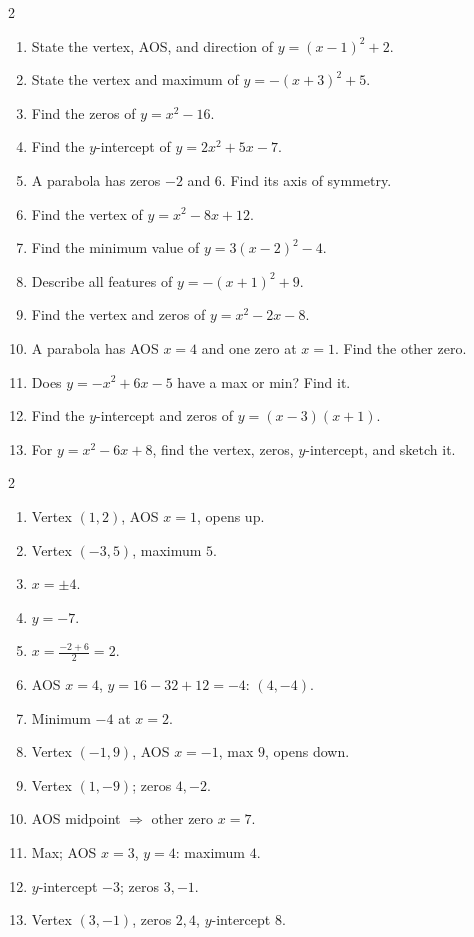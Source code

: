 \documentclass[11pt]{article}
\begin{document}
\clearpage
{}

\begin{recapbox}
\begin{multicols}{2}
\small
\begin{enumerate}[leftmargin=*,itemsep=3pt]
  \item State the vertex, AOS, and direction of $y=(x-1)^2+2$.
  \item State the vertex and maximum of $y=-(x+3)^2+5$.
  \item Find the zeros of $y=x^2-16$.
  \item Find the $y$-intercept of $y=2x^2+5x-7$.
  \item A parabola has zeros $-2$ and $6$. Find its axis of symmetry.
  \item Find the vertex of $y=x^2-8x+12$.
  \item Find the minimum value of $y=3(x-2)^2-4$.
  \item Describe all features of $y=-(x+1)^2+9$.
  \item Find the vertex and zeros of $y=x^2-2x-8$.
  \item A parabola has AOS $x=4$ and one zero at $x=1$. Find the other zero.
  \item Does $y=-x^2+6x-5$ have a max or min? Find it.
  \item Find the $y$-intercept and zeros of $y=(x-3)(x+1)$.
  \item For $y=x^2-6x+8$, find the vertex, zeros, $y$-intercept, and sketch it.
\end{enumerate}
\end{multicols}
\end{recapbox}

\begin{keybox}
\begin{multicols}{2}
\small
\begin{enumerate}[leftmargin=*,itemsep=3pt]
  \item Vertex $(1,2)$, AOS $x=1$, opens up.
  \item Vertex $(-3,5)$, maximum $5$.
  \item $x=\pm4$.
  \item $y=-7$.
  \item $x=\tfrac{-2+6}{2}=2$.
  \item AOS $x=4$, $y=16-32+12=-4$: $(4,-4)$.
  \item Minimum $-4$ at $x=2$.
  \item Vertex $(-1,9)$, AOS $x=-1$, max $9$, opens down.
  \item Vertex $(1,-9)$; zeros $4,-2$.
  \item AOS midpoint $\Rightarrow$ other zero $x=7$.
  \item Max; AOS $x=3$, $y=4$: maximum $4$.
  \item $y$-intercept $-3$; zeros $3,-1$.
  \item Vertex $(3,-1)$, zeros $2,4$, $y$-intercept $8$.
\end{enumerate}
\end{multicols}
\end{keybox}
\end{document}
